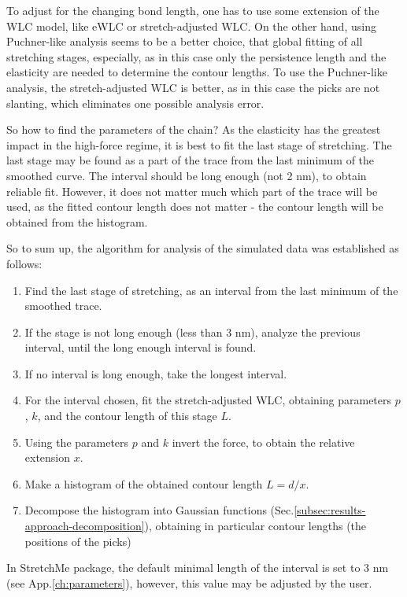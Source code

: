 To adjust for the changing bond length, one has to use some extension of the WLC model, like eWLC or stretch-adjusted WLC\@.
On the other hand, using Puchner-like analysis seems to be a better choice, that global fitting of all stretching stages, especially, as in this case only the persistence length and the elasticity are needed to determine the contour lengths.
To use the Puchner-like analysis, the stretch-adjusted WLC is better, as in this case the picks are not slanting, which eliminates one possible analysis error.

So how to find the parameters of the chain?
As the elasticity has the greatest impact in the high-force regime, it is best to fit the last stage of stretching.
The last stage may be found as a part of the trace from the last minimum of the smoothed curve.
The interval should be long enough (not 2 nm), to obtain reliable fit.
However, it does not matter much which part of the trace will be used, as the fitted contour length does not matter - the contour length will be obtained from the histogram.

So to sum up, the algorithm for analysis of the simulated data was established as follows:
\begin{enumerate}
    \item Find the last stage of stretching, as an interval from the last minimum of the smoothed trace.
    \item If the stage is not long enough (less than 3 nm), analyze the previous interval, until the long enough interval is found.
    \item If no interval is long enough, take the longest interval.
    \item For the interval chosen, fit the stretch-adjusted WLC, obtaining parameters $p$, $k$, and the contour length of this stage $L$.
    \item Using the parameters $p$ and $k$ invert the force, to obtain the relative extension $x$.
    \item Make a histogram of the obtained contour length $L=d/x$.
    \item Decompose the histogram into Gaussian functions (Sec.\ref{subsec:results-approach-decomposition}), obtaining in particular contour lengths (the positions of the picks)
\end{enumerate}

In StretchMe package, the default minimal length of the interval is set to 3 nm (see App.\ref{ch:parameters}), however, this value may be adjusted by the user.

